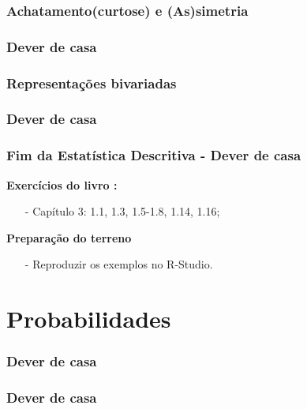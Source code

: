 \documentclass[graphics,14pt]{beamer}
\begin{document}
\begin{frame}[t,fragile=singleslide]
\frametitle{Achatamento(curtose) e (As)simetria}

\end{frame}
\begin{frame}[t,fragile=singleslide]
\frametitle{Dever de casa}
\end{frame}
\begin{frame}[t,fragile=singleslide]
\frametitle{Representações bivariadas}

\end{frame}
\begin{frame}[t,fragile=singleslide]
\frametitle{Dever de casa}
\end{frame}

\begin{frame}[t,fragile=singleslide]
\frametitle{Fim da Estatística Descritiva - Dever de casa}
	\textbf{Exercícios do livro \cite{Agresti2018}:}
	\begin{itemize}
		\item[-] Capítulo 3: 1.1, 1.3, 1.5-1.8, 1.14, 1.16;
	\end{itemize}
	\textbf{Preparação do terreno}
	\begin{itemize}
		\item[-] Reproduzir os exemplos no R-Studio.
	\end{itemize}	
	
\end{frame}

\section{Probabilidades}
\begin{frame}[t,fragile=singleslide]
\frametitle{Dever de casa}
\end{frame}

\begin{frame}[t,fragile=singleslide]
\frametitle{Dever de casa}
\end{frame}
\end{document}
